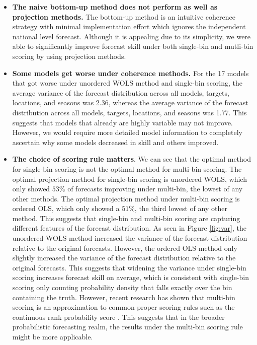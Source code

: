 \documentclass{umassthesis}          %
\begin{document}
\begin{itemize}
   \item \textbf{The naive bottom-up method does not perform as well as projection methods.} The bottom-up method is an intuitive coherence strategy with minimal implementation effort which ignores the independent national level forecast. Although it is appealing due to its simplicity, we were able to significantly improve forecast skill under both single-bin and mutli-bin scoring by using projection methods. 
   \item \textbf{Some models get worse under coherence methods.} For the 17 models that got worse under unordered WOLS method and single-bin scoring, the average variance of the forecast distribution across all models, targets, locations, and seasons was 2.36, whereas the average variance of the forecast distribution across all models, targets, locations, and seasons was 1.77. This suggests that models that already are highly variable may not improve. However, we would require more detailed model information to completely ascertain why some models decreased in skill and others improved. 
   \item \textbf{The choice of scoring rule matters}. We can see that the optimal method for single-bin scoring is not the optimal method for multi-bin scoring. The optimal projection method for single-bin scoring is unordered WOLS, which only showed $53\%$ of forecasts improving under multi-bin, the lowest of any other methods. The optimal projection method under multi-bin scoring is ordered OLS, which only showed a $51\%$, the third lowest of any other method. This suggests that single-bin and multi-bin scoring are capturing different features of the forecast distribution. As seen in Figure \ref{fig:var}, the unordered WOLS method increased the variance of the forecast distribution relative to the original forecasts. However, the ordered OLS method only slightly increased the variance of the forecast distribution relative to the original forecasts. This suggests that widening the variance under single-bin scoring increases forecast skill on average, which is consistent with single-bin scoring only counting probability density that falls exactly over the bin containing the truth. However, recent research has shown that multi-bin scoring is an approximation to common proper scoring rules such as the continuous rank probability score \cite{scoring}. This suggests that in the broader probabilistic forecasting realm, the results under the multi-bin scoring rule might be more applicable.    
   
   \end{itemize}
   
\end{document}
